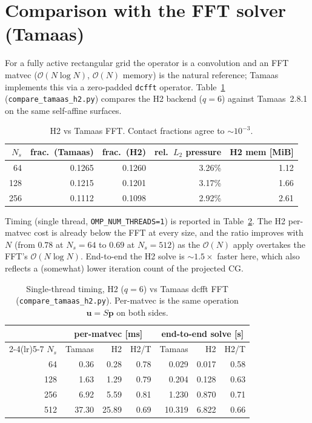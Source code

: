 \documentclass[11pt,a4paper]{article}
\newcommand{\Order}{\mathcal{O}}
\begin{document}
\section{Comparison with the FFT solver (Tamaas)}

For a fully active rectangular grid the operator is a convolution and an FFT
matvec ($\Order(N\log N)$, $\Order(N)$ memory) is the natural reference;
Tamaas implements this via a zero-padded \texttt{dcfft} operator.
Table~\ref{tab:tamaas} (\texttt{compare\_tamaas\_h2.py}) compares the H2
backend ($q=6$) against Tamaas~2.8.1 on the same self-affine surfaces.

\begin{table}[h]
\centering
\begin{tabular}{rrrrr}
\toprule
$N_s$ & frac.\ (Tamaas) & frac.\ (H2) & rel.\ $L_2$ pressure & H2 mem [MiB] \\
\midrule
64  & 0.1265 & 0.1260 & 3.26\% & 1.12 \\
128 & 0.1215 & 0.1201 & 3.17\% & 1.66 \\
256 & 0.1112 & 0.1098 & 2.92\% & 2.61 \\
\bottomrule
\end{tabular}
\caption{H2 vs Tamaas FFT. Contact fractions agree to $\sim10^{-3}$.}
\label{tab:tamaas}
\end{table}

Timing (single thread, \texttt{OMP\_NUM\_THREADS=1}) is reported in
Table~\ref{tab:tamaas-time}. The H2 per-matvec cost is already below the FFT
at every size, and the ratio improves with $N$ (from $0.78$ at $N_s=64$ to
$0.69$ at $N_s=512$) as the $\Order(N)$ apply overtakes the FFT's
$\Order(N\log N)$. End-to-end the H2 solve is $\sim1.5\times$ faster here,
which also reflects a (somewhat) lower iteration count of the projected CG.

\begin{table}[h]
\centering
\begin{tabular}{rrrrrrr}
\toprule
& \multicolumn{3}{c}{per-matvec [ms]} & \multicolumn{3}{c}{end-to-end solve [s]} \\
\cmidrule(lr){2-4}\cmidrule(lr){5-7}
$N_s$ & Tamaas & H2 & H2/T & Tamaas & H2 & H2/T \\
\midrule
64  &  0.36 &  0.28 & 0.78 &  0.029 & 0.017 & 0.58 \\
128 &  1.63 &  1.29 & 0.79 &  0.204 & 0.128 & 0.63 \\
256 &  6.92 &  5.59 & 0.81 &  1.230 & 0.870 & 0.71 \\
512 & 37.30 & 25.89 & 0.69 & 10.319 & 6.822 & 0.66 \\
\bottomrule
\end{tabular}
\caption{Single-thread timing, H2 ($q=6$) vs Tamaas dcfft FFT
(\texttt{compare\_tamaas\_h2.py}). Per-matvec is the same operation
$\mathbf{u}=S\mathbf{p}$ on both sides.}
\label{tab:tamaas-time}
\end{table}
\end{document}
